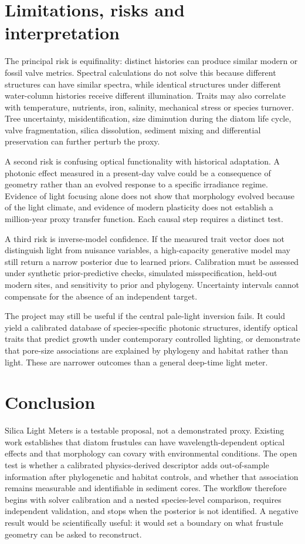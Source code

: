 \documentclass[11pt,a4paper]{article}
\begin{document}
\section{Limitations, risks and interpretation}
The principal risk is equifinality: distinct histories can produce similar modern or fossil valve metrics. Spectral calculations do not solve this because different structures can have similar spectra, while identical structures under different water-column histories receive different illumination. Traits may also correlate with temperature, nutrients, iron, salinity, mechanical stress or species turnover. Tree uncertainty, misidentification, size diminution during the diatom life cycle, valve fragmentation, silica dissolution, sediment mixing and differential preservation can further perturb the proxy.

A second risk is confusing optical functionality with historical adaptation. A photonic effect measured in a present-day valve could be a consequence of geometry rather than an evolved response to a specific irradiance regime. Evidence of light focusing alone does not show that morphology evolved because of the light climate, and evidence of modern plasticity does not establish a million-year proxy transfer function. Each causal step requires a distinct test.

A third risk is inverse-model confidence. If the measured trait vector does not distinguish light from nuisance variables, a high-capacity generative model may still return a narrow posterior due to learned priors. Calibration must be assessed under synthetic prior-predictive checks, simulated misspecification, held-out modern sites, and sensitivity to prior and phylogeny. Uncertainty intervals cannot compensate for the absence of an independent target.

The project may still be useful if the central pale-light inversion fails. It could yield a calibrated database of species-specific photonic structures, identify optical traits that predict growth under contemporary controlled lighting, or demonstrate that pore-size associations are explained by phylogeny and habitat rather than light. These are narrower outcomes than a general deep-time light meter.

\section{Conclusion}
Silica Light Meters is a testable proposal, not a demonstrated proxy. Existing work establishes that diatom frustules can have wavelength-dependent optical effects and that morphology can covary with environmental conditions. The open test is whether a calibrated physics-derived descriptor adds out-of-sample information after phylogenetic and habitat controls, and whether that association remains measurable and identifiable in sediment cores. The workflow therefore begins with solver calibration and a nested species-level comparison, requires independent validation, and stops when the posterior is not identified. A negative result would be scientifically useful: it would set a boundary on what frustule geometry can be asked to reconstruct.
\end{document}
